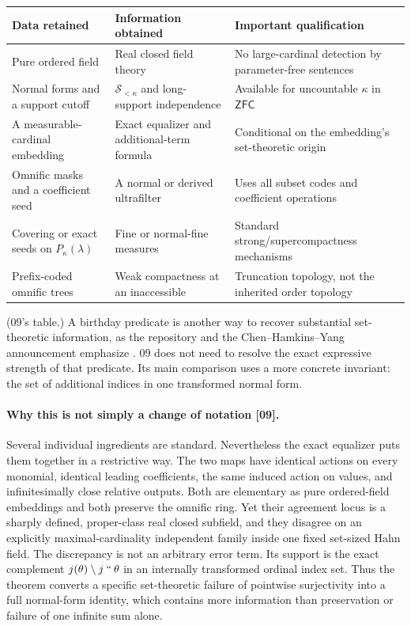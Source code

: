 \documentclass[11pt,letterpaper]{article}
\numberwithin{equation}{section}
\theoremstyle{definition}
\theoremstyle{remark}
\newcommand{\Sk}{\mathscr S_{<\kappa}}
\newcommand{\imset}[2]{#1\mathbin{``}#2}
\newcommand{\ZFC}{\mathsf{ZFC}}
\newcommand{\src}[1]{\textup{\textsf{\small[#1]}}}%
\begin{document}
\begin{center}\small
\begin{longtable}{@{}P{0.25\textwidth}P{0.32\textwidth}P{0.35\textwidth}@{}}
\toprule
Data retained & Information obtained & Important qualification\\
\midrule\endhead
Pure ordered field & Real closed field theory & No large-cardinal detection
by parameter-free sentences\\[3pt]
Normal forms and a support cutoff & $\Sk$ and long-support independence &
Available for uncountable $\kappa$ in $\ZFC$\\[3pt]
A measurable-cardinal embedding & Exact equalizer and additional-term
formula & Conditional on the embedding's set-theoretic origin\\[3pt]
Omnific masks and a coefficient seed & A normal or derived ultrafilter &
Uses all subset codes and coefficient operations\\[3pt]
Covering or exact seeds on $P_\kappa(\lambda)$ & Fine or normal-fine
measures & Standard strong/supercompactness mechanisms\\[3pt]
Prefix-coded omnific trees & Weak compactness at an inaccessible &
Truncation topology, not the inherited order topology\\
\bottomrule
\end{longtable}
\end{center}
(09's table.) A birthday predicate is another way to recover substantial
set-theoretic information, as the repository and the Chen--Hamkins--Yang
announcement emphasize \cite{RepoBirthday,CHY}. 09 does not need to resolve
the exact expressive strength of that predicate. Its main comparison uses a
more concrete invariant: the set of additional indices in one transformed
normal form.

\paragraph{Why this is not simply a change of notation \src{09}.} Several
individual ingredients are standard. Nevertheless the exact equalizer puts
them together in a restrictive way. The two maps have identical actions on
every monomial, identical leading coefficients, the same induced action on
values, and infinitesimally close relative outputs. Both are elementary as
pure ordered-field embeddings and both preserve the omnific ring. Yet their
agreement locus is a sharply defined, proper-class real closed subfield,
and they disagree on an explicitly maximal-cardinality independent family
inside one fixed set-sized Hahn field. The discrepancy is not an arbitrary
error term. Its support is the exact complement $j(\theta)\setminus\imset
j\theta$ in an internally transformed ordinal index set. Thus the theorem
converts a specific set-theoretic failure of pointwise surjectivity into a
full normal-form identity, which contains more information than
preservation or failure of one infinite sum alone.
\end{document}
